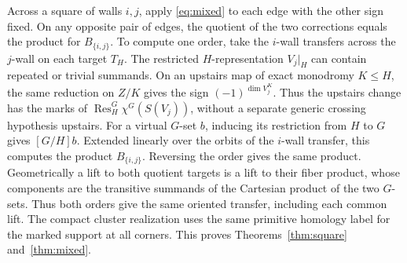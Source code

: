 Across a square of walls \(i,j\), apply \eqref{eq:mixed} to each edge with the other sign fixed. On any opposite pair of edges, the quotient of the two corrections equals the product for \(B_{\{i,j\}}\). To compute one order, take the \(i\)-wall transfers across the \(j\)-wall on each target \(T_H\). The restricted \(H\)-representation \(V_j|_H\) can contain repeated or trivial summands. On an upstairs map of exact monodromy \(K\le H\), the same reduction on \(Z/K\) gives the sign \((-1)^{\dim V_j^K}\). Thus the upstairs change has the marks of \(\operatorname{Res}^G_H\chi^G(S(V_j))\), without a separate generic crossing hypothesis upstairs. For a virtual \(G\)-set \(b\), inducing its restriction from \(H\) to \(G\) gives \([G/H]b\). Extended linearly over the orbits of the \(i\)-wall transfer, this computes the product \(B_{\{i,j\}}\). Reversing the order gives the same product. Geometrically a lift to both quotient targets is a lift to their fiber product, whose components are the transitive summands of the Cartesian product of the two \(G\)-sets. Thus both orders give the same oriented transfer, including each common lift. The compact cluster realization uses the same primitive homology label for the marked support at all corners. This proves Theorems~\ref{thm:square} and~\ref{thm:mixed}.
